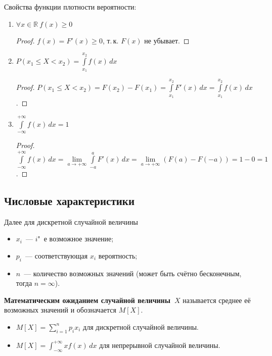 Свойства функции плотности вероятности:
\begin{enumerate}
	\item $\forall x \in \mathbb R \ f(x) \geqslant 0$
	\begin{proof}
	$f(x) = F'(x) \geqslant 0$, т.\,к. $F(x)$ не убывает.
	\end{proof}
	
	\item $P(x_1 \leqslant X < x_2) = \int\limits_{x_1}^{x_2} f(x)\,dx$
	\begin{proof}
	$P(x_1 \leqslant X < x_2) =
	F(x_2) - F(x_1) =
	\int\limits_{x_1}^{x_2} F'(x)\,dx =
	\int\limits_{x_1}^{x_2} f(x)\,dx$.
	\end{proof}
	
	\item $\int\limits_{-\infty}^{+\infty} f(x)\,dx = 1$
	\begin{proof}
	$\int\limits_{-\infty}^{+\infty} f(x)\,dx =
	\lim\limits_{a \to +\infty} \int\limits_{-a}^a F'(x)\,dx =
	\lim\limits_{a \to +\infty} (F(a) - F(-a)) =
	1 - 0 =
	1$.
	\end{proof}
\end{enumerate}

\subsection{Числовые характеристики}
Далее для дискретной случайной величины
\begin{itemize}
	\item $x_i$~--- $i$"~е возможное значение;
	\item $p_i$~--- соответствующая $x_i$ вероятность;
	\item $n$~--- количество возможных значений (может быть счётно бесконечным, тогда $n = \infty$).
\end{itemize}

 \textbf{Математическим ожиданием случайной величины~$X$} называется среднее её возможных значений и обозначается $M[X]$.
\begin{itemize}
	\item $\displaystyle M[X] = \sum_{i=1}^n p_i x_i$ для дискретной случайной величины.
	\item $\displaystyle M[X] = \int_{-\infty}^{+\infty} x f(x)\,dx$ для непрерывной случайной величины.
\end{itemize}

